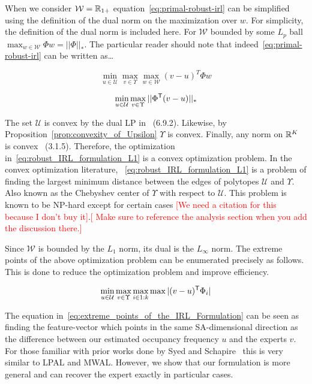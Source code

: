 \documentclass[11pt]{article}
\newcommand{\gersi}[1]{\textcolor{red}{[#1]}}
\begin{document}
When we consider $\mathcal{W} = \mathbb{R}_{1+}$ equation~\eqref{eq:primal-robust-irl} can be simplified using the definition of the dual norm on the maximization
over $w$. For simplicity, the definition of the dual norm is included here. For $\mathcal{W}$ bounded by some $L_p$ ball $\max_{w \in \mathcal{W}} \Phi w = ||\Phi||_*$.
The particular reader should note that indeed~\eqref{eq:primal-robust-irl} can be written as\dots

\begin{equation}
	\min_{u \in \mathcal{U}} \max_{v \in \Upsilon} \max_{w \in \mathcal{W}} {(v - u)}^T \Phi w
\end{equation}

\begin{equation}
	\label{eq:robust_IRL_formulation_L1}
	\min_{u \in \mathcal{U}} \max_{v \in \Upsilon} ||\Phi^{\mathsf{T}} (v - u)||_*
\end{equation}

The set $\mathcal{U}$ is convex by the dual LP in~\cite{PUTERMAN} (6.9.2).
Likewise, by Proposition~\ref{prop:convexity_of_Upsilon} $\Upsilon$ is convex.
Finally, any norm on $\mathbb{R}^K$ is convex~\cite{boyd_convex_optimization} (3.1.5).
Therefore, the optimization in~\eqref{eq:robust_IRL_formulation_L1} is a convex
optimization problem. In the convex optimization literature,
~\eqref{eq:robust_IRL_formulation_L1} is a problem of finding the largest minimum
distance between the edges of polytopes $\mathcal{U}$ and $\Upsilon$. Also known as the Chebyshev center of $\Upsilon$ with respect to $\mathcal{U}$.
This problem is known to be NP-hard except for certain cases \gersi{We need a
	citation for this because I don't buy it}.\gersi{ Make sure to reference the analysis section when you add the discussion there.}

Since $\mathcal{W}$ is bounded by the $L_1$ norm, its dual is the $L_\infty$ norm. The extreme points of the above
optimization problem can be enumerated precisely as follows.
This is done to reduce the optimization problem and improve efficiency.

\begin{equation}
	\label{eq:extreme_points_of_the_IRL_Formulation}
	\min_{u \in \mathcal{U}} \max_{v \in \Upsilon} \max_{i \in 1:k} \max|(v - u)^{\mathsf{T}} \Phi_i|
\end{equation}

The equation in~\eqref{eq:extreme_points_of_the_IRL_Formulation} can be seen as
finding the feature-vector which points in the same SA-dimensional direction as
the difference between our estimated occupancy frequency $u$ and the experts
$v$. For those familiar with prior works done by Syed and Schapire~\cite{Syed2008} this is very similar to LPAL and MWAL. 
However, we show that our formulation is more general and can recover the expert exactly in particular cases.
\end{document}
